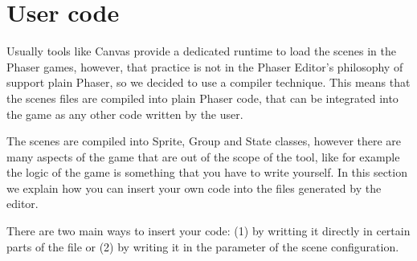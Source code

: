 \documentclass[letterpaper,10pt,english]{sphinxmanual}
\begin{document}
\begin{sphinxVerbatim}[commandchars=\\\{\}]
             

         


    




\end{sphinxVerbatim}


\section{User code}
\label{\detokenize{canvas:user-code}}
Usually tools like Canvas provide a dedicated runtime to load the scenes in the Phaser games, however, that practice is not in the Phaser Editor’s philosophy of support plain Phaser, so we decided to use a compiler technique. This means that the scenes files are compiled into plain Phaser code, that can be integrated into the game as any other code written by the user.

The scenes are compiled into Sprite, Group and State classes, however there are many aspects of the game that are out of the scope of the tool, like for example the logic of the game is something that you have to write yourself. In this section we explain how you can insert your own code into the files generated by the editor.

There are two main ways to insert your code: (1) by writting it directly in certain parts of the file or (2) by writing it in the  parameter of the scene configuration.
\end{document}
